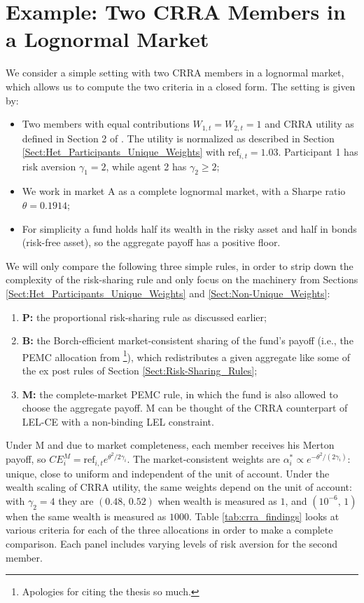 \documentclass[11pt,a4paper]{article}
\theoremstyle{definition}
\theoremstyle{plain}
\theoremstyle{remark}
\newcommand{\1}{\mathbf{1}}
\begin{document}
\section{Example: Two CRRA Members in a Lognormal Market}
\label{Sect:Example}
We consider a simple setting with two CRRA members in a lognormal market, which allows us to compute the two criteria in a closed form. The setting is given by:
\begin{itemize}
    \item Two members with equal contributions $W_{1,t} = W_{2,t} = 1$ and CRRA utility as defined in Section 2 of \citet{Hlebarov_2026_MSc_Thesis}. The utility is normalized as described in Section \ref{Sect:Het_Participants_Unique_Weights} with $\text{ref}_{i,t} = 1.03$. Participant 1 has risk aversion $\gamma_1 = 2$, while agent 2 has $\gamma_2 \geq 2$;
    \item We work in market A as a complete lognormal market, with a Sharpe ratio $\theta = 0.1914$;
    \item For simplicity a fund holds half its wealth in the risky asset and half in bonds (risk-free asset), so the aggregate payoff has a positive floor.
\end{itemize}
We will only compare the following three simple rules, in order to strip down the complexity of the risk-sharing rule and only focus on the machinery from Sections \ref{Sect:Het_Participants_Unique_Weights} and \ref{Sect:Non-Unique_Weights}:
\begin{enumerate}
    \item \textbf{P:} the proportional risk-sharing rule as discussed earlier;
    \item \textbf{B:} the Borch-efficient market-consistent sharing of the fund's payoff (i.e., the PEMC allocation from \citet{Hlebarov_2026_MSc_Thesis}\footnote{Apologies for citing the thesis so much.}), which redistributes a given aggregate like some of the ex post rules of Section \ref{Sect:Risk-Sharing_Rules};
    \item \textbf{M:} the complete-market PEMC rule, in which the fund is also allowed to choose the aggregate payoff. M can be thought of the CRRA counterpart of LEL-CE with a non-binding LEL constraint.
\end{enumerate}
Under M and due to market completeness, each member receives his Merton payoff, so $CE_i^M = \text{ref}_{i,t} e^{\theta^2/2\gamma_i}$. The market-consistent weights are $\alpha^*_i\propto e^{-\theta^2/(2\gamma_i)}$: unique, close to uniform and independent of the unit of account. Under the wealth scaling of CRRA utility, the same weights depend on the unit of account: with $\gamma_2=4$ they are $(0.48,\,0.52)$ when wealth is measured as $1$, and $(10^{-6},\,1)$ when the same wealth is measured as $1000$. Table \ref{tab:crra_findings} looks at various criteria for each of the three allocations in order to make a complete comparison. Each panel includes varying levels of risk aversion for the second member.
\end{document}
